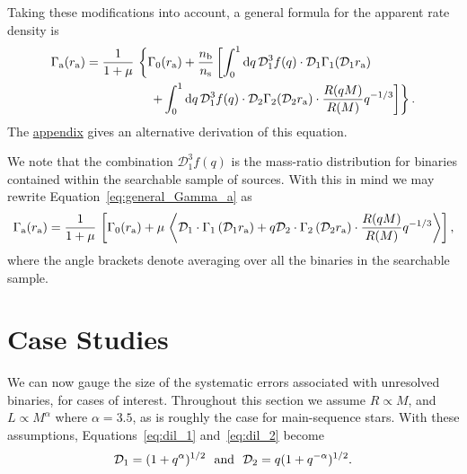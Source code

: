 \documentclass[12pt,modern]{aastex61}
\renewcommand{\a}{_{\rm a}}
\newcommand{\s}{_{\rm s}}
\renewcommand{\b}{_{\rm b}}
\begin{document}
Taking these modifications into account, a general formula for the
apparent rate density is
\begin{align}
    \notag
    \Gamma\a(r\a) &= \frac{1}{1+\mu} \,
    \left\{ \Gamma_0(r\a)+ 
    \frac{n\b}{n\s}
    \left[ \int_0^1 \mathrm{d}q \,
           \mathcal{D}_1^3 f(q)\cdot
           \mathcal{D}_1 \Gamma_1(\mathcal{D}_1r\a)\,
    \right.   
    \right. \\
    & \quad\quad\quad\quad\quad \left.\left.
    +\int_0^1 {\rm d}q\, 
         \mathcal{D}_1^3 f(q)\cdot \mathcal{D}_2
         \Gamma_2(\mathcal{D}_2r\a)\cdot
         \frac{R(qM)}{R(M)} q^{-1/3}
    \right] \right\}.
    \label{eq:general_Gamma_a}
\end{align}
The \hyperref[sec:appendix]{appendix} gives an alternative derivation
of this equation.

We note that the combination $\mathcal{D}_1^3f(q)$ is the mass-ratio
distribution for binaries contained within the searchable sample of
sources.  With this in mind we may rewrite
Equation~\ref{eq:general_Gamma_a} as
\begin{align}
    \Gamma\a(r\a)
    =%
    {1\over 1+\mu} \,
    \left[
       \Gamma_0(r\a)%
       +\mu\,
       \left\langle
       \mathcal{D}_1\cdot\Gamma_1\left(\mathcal{D}_1r\a\right)
       +
       {q \mathcal{D}_2}\cdot\Gamma_2\left(\mathcal{D}_2r\a\right)
       \cdot
       {R(qM) \over R(M)}q^{-1/3}
       \right\rangle
    \right],
\end{align}
where the angle brackets denote averaging over all the binaries in the
searchable sample.



\section{Case Studies}
\label{sec:more_complicated}

We can now gauge the size of the systematic errors associated
with unresolved binaries, for cases of interest.  Throughout this
section we assume $R\propto M$, and $L \propto M^{\alpha}$ where
$\alpha = 3.5$, as is roughly the case for main-sequence stars.
With these assumptions, Equations~\ref{eq:dil_1} and~\ref{eq:dil_2}
become
\begin{equation}
  \mathcal{D}_1
  =  (1+q^\alpha)^{1/2}~~{\rm and}~~\mathcal{D}_2
  = q(1+q^{-\alpha})^{1/2}.
\end{equation}
\end{document}
